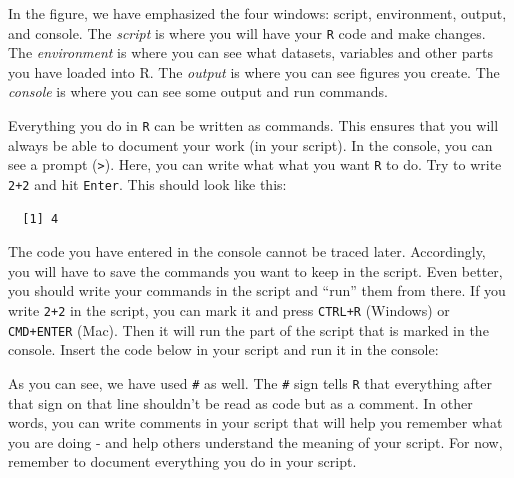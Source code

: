 \documentclass[12pt,oneside]{reedthesis}
\theoremstyle{definition}
\theoremstyle{definition}
\theoremstyle{definition}
\theoremstyle{remark}
\begin{document}
  In the figure, we have emphasized the four windows: script, environment,
  output, and console. The \emph{script} is where you will have your
  \texttt{R} code and make changes. The \emph{environment} is where you
  can see what datasets, variables and other parts you have loaded into R.
  The \emph{output} is where you can see figures you create. The
  \emph{console} is where you can see some output and run commands.
  
  Everything you do in \texttt{R} can be written as commands. This ensures
  that you will always be able to document your work (in your script). In
  the console, you can see a prompt (\texttt{\textgreater{}}). Here, you
  can write what what you want \texttt{R} to do. Try to write \texttt{2+2}
  and hit \texttt{Enter}. This should look like this:
  \begin{Shaded}
  \begin{Highlighting}[]
  \OperatorTok{+}
  \end{Highlighting}
  \end{Shaded}
  \begin{verbatim}
  [1] 4
  \end{verbatim}
  The code you have entered in the console cannot be traced later.
  Accordingly, you will have to save the commands you want to keep in the
  script. Even better, you should write your commands in the script and
  ``run'' them from there. If you write \texttt{2+2} in the script, you
  can mark it and press \texttt{CTRL+R} (Windows) or \texttt{CMD+ENTER}
  (Mac). Then it will run the part of the script that is marked in the
  console. Insert the code below in your script and run it in the console:
  \begin{Shaded}
  \begin{Highlighting}[]
  \OperatorTok{*}
  \OperatorTok{**}        
  \OperatorTok{**}        
  \NormalTok{(}\NormalTok{)    }
  \end{Highlighting}
  \end{Shaded}
  As you can see, we have used \texttt{\#} as well. The \texttt{\#} sign
  tells \texttt{R} that everything after that sign on that line shouldn't
  be read as code but as a comment. In other words, you can write comments
  in your script that will help you remember what you are doing - and help
  others understand the meaning of your script. For now, remember to
  document everything you do in your script.
  
\end{document}
